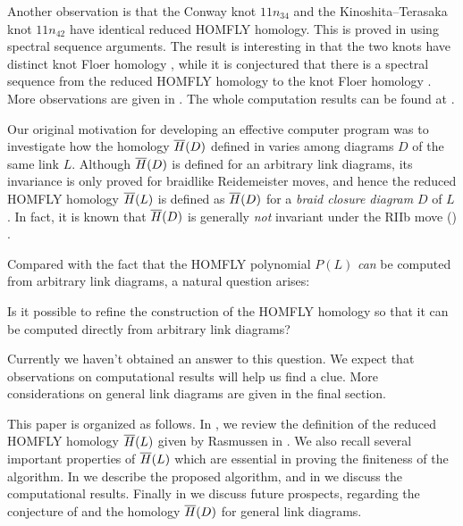 Another observation is that the Conway knot $11n_{34}$ and the Kinoshita--Terasaka knot $11n_{42}$ have identical reduced HOMFLY homology. This is proved in \cite{MV08} using spectral sequence arguments. The result is interesting in that the two knots have distinct knot Floer homology \cite{OS04}, while it is conjectured that there is a spectral sequence from the reduced HOMFLY homology to the knot Floer homology \cite{DGR}. More observations are given in . The whole computation results 
can be found at \cite{kr-calc}.

Our original motivation for developing an effective computer program was to investigate how the homology $\overline{H}(D)$ defined in \cite{Ras15} varies among diagrams $D$ of the same link $L$. 
Although $\overline{H}(D)$ is defined for an arbitrary link diagrams, its invariance is only proved for braidlike Reidemeister moves, and hence the reduced HOMFLY homology $\overline{H}(L)$ is defined as $\overline{H}(D)$ for a \textit{braid closure diagram} $D$ of $L$. 
In fact, it is known that $\overline{H}(D)$ is generally \textit{not} invariant under the RIIb move () \cite{Abel17, Nak20}.


Compared with the fact that the HOMFLY polynomial $P(L)$ \textit{can} be computed from arbitrary link diagrams, a natural question arises:

\begin{question} \label{question:refine-H}
    Is it possible to refine the construction of the HOMFLY homology so that it can be computed directly from arbitrary link diagrams?
\end{question}

Currently we haven't obtained an answer to this question. We expect that observations on computational results will help us find a clue. More considerations on general link diagrams are given in the final section.

This paper is organized as follows. In , we review the definition of the reduced HOMFLY homology $\overline{H}(L)$ given by Rasmussen in \cite{Ras15}. We also recall several important properties of $\overline{H}(L)$ which are essential in proving the finiteness of the algorithm. In  we describe the proposed algorithm, and in  we discuss the computational results. Finally in  we discuss future prospects, regarding the conjecture of \cite{DGR} and the homology $\overline{H}(D)$ for general link diagrams. 